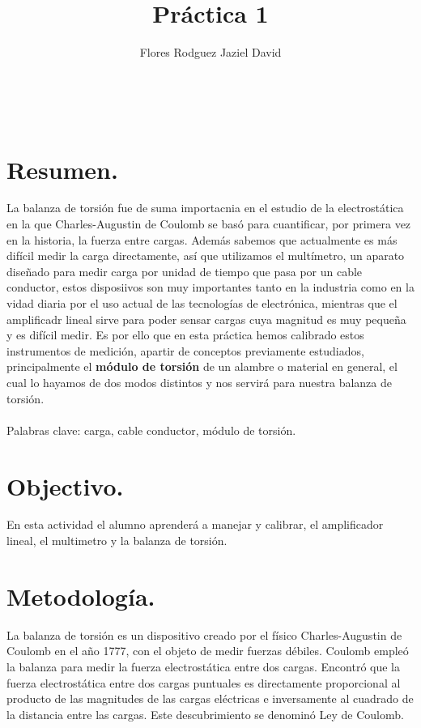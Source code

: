 \documentclass[11pt,a4paper]{article}
\author{Flores Rodguez Jaziel David }
\title{Práctica 1}
\begin{document}
\tableofcontents
\\
\medskip
\medskip
\section{Resumen.}
La balanza de torsi\'{o}n fue de suma importacnia en el estudio de la electrost\'{a}tica en la que Charles-Augustin de Coulomb se bas\'{o} para cuantificar, por primera vez en la historia, la fuerza entre cargas. Adem\'{a}s sabemos que actualmente es m\'{a}s dif\'{i}cil medir la carga directamente, as\'{i} que utilizamos el mult\'{i}metro, un aparato dise\~{n}ado para medir carga por unidad de tiempo que pasa por un cable conductor, estos disposiivos son muy importantes tanto en la industria como en la vidad diaria por el uso actual de las tecnolog\'{i}as de electr\'{o}nica, mientras que el amplificadr lineal sirve para poder sensar cargas cuya magnitud es muy peque\~{n}a y es dif\'{i}cil medir. Es por ello que en esta pr\'{a}ctica hemos calibrado estos instrumentos de medici\'{o}n, apartir de conceptos previamente estudiados, principalmente el \textbf{m\'{o}dulo de torsi\'{o}n} de un alambre o material en general, el cual lo hayamos de dos modos distintos y nos servir\'{a} para nuestra balanza de torsi\'{o}n. \\
\\
\medskip
Palabras clave: carga, cable conductor, m\'{o}dulo de torsi\'{o}n.


\section{Objectivo.}
En esta actividad el alumno aprender\'{a} a manejar y calibrar, el amplificador lineal, el mult{i}metro y la balanza de torsi\'{o}n.

\pagebreak

\section{Metodolog\'{i}a.}
La balanza de torsi\'{o}n es un dispositivo creado por el f\'{i}sico Charles-Augustin de Coulomb en el a\~{n}o 1777, con el objeto de medir fuerzas d\'{e}biles. Coulomb emple\'{o} la balanza para medir la fuerza electrost\'{a}tica entre dos cargas. Encontr\'{o} que la fuerza electrost\'{a}tica entre dos cargas puntuales es directamente proporcional al producto de las magnitudes de las cargas el\'{e}ctricas e inversamente al cuadrado de la distancia entre las cargas. Este descubrimiento se denomin\'{o} Ley de Coulomb.
\end{document}
